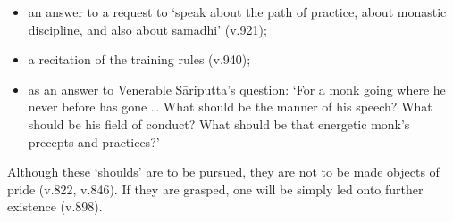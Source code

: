 \begin{itemize}
\item an answer to a request to `speak about the path of practice, about monastic discipline, and also about samadhi' (v.921);
\item a recitation of the training rules (v.940);
\item as an answer to Venerable Sāriputta's question: `For a monk going where he never before has gone \ldots{} What should be the manner of his speech? What should be his field of conduct? What should be that energetic monk's precepts and practices?'
\end{itemize}

Although these `shoulds' are to be pursued, they are not to be made objects of pride (v.822, v.846). If they are grasped, one will be simply led onto further existence (v.898).
